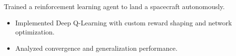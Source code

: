 Trained a reinforcement learning agent to land a spacecraft autonomously.
\begin{itemize}
\item Implemented Deep Q-Learning with custom reward shaping and network optimization.
\item Analyzed convergence and generalization performance.
\end{itemize}
{\LaTeXraggedright
{}
\par}